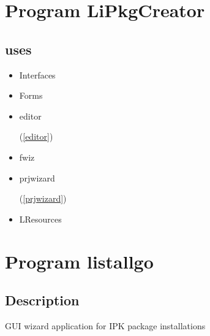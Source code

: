\documentclass{report}
\begin{document}
\chapter{Program LiPkgCreator}
\label{LiPkgCreator}
\section{uses}
\begin{itemize}
\item \begin{ttfamily}Interfaces\end{ttfamily}\item \begin{ttfamily}Forms\end{ttfamily}\item \begin{ttfamily}editor\end{ttfamily}(\ref{editor})\item \begin{ttfamily}fwiz\end{ttfamily}\item \begin{ttfamily}prjwizard\end{ttfamily}(\ref{prjwizard})\item \begin{ttfamily}LResources\end{ttfamily}\end{itemize}
\chapter{Program listallgo}
\label{listallgo}
\section{Description}
GUI wizard application for IPK package installations
\end{document}
